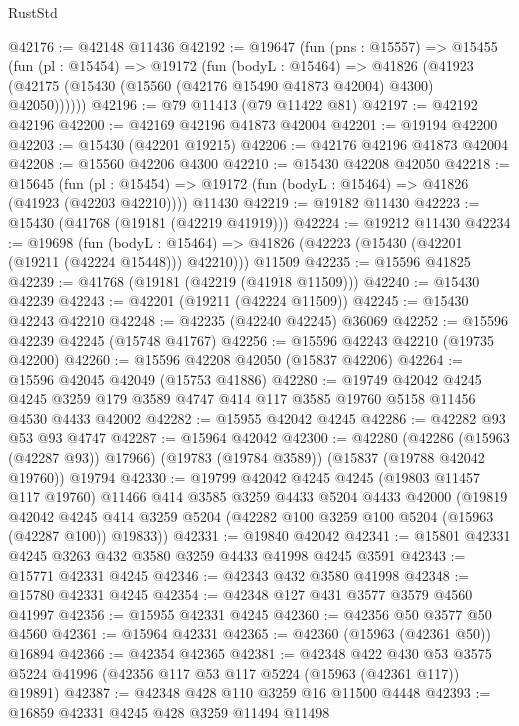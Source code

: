 \begin{lexlean}{RustStd}
\begin{coremodule}
{\begin{coremodule}
{{{{{{{{{{{{{{{{{{{{{{{{{{{{{{{{{{{{{{{{{{{{{{{{{{{{{{{{{{{{@42176 := @42148 @11436
@42192 := @19647
    (fun (pns : @15557) =>
    @15455
      (fun (pl : @15454) =>
      @19172
        (fun (bodyL : @15464) =>
        @41826 (@41923 (@42175 (@15430 (@15560 (@42176 @15490 @41873 @42004) @4300) @42050))))))
@42196 := @79 @11413 (@79 @11422 @81)
@42197 := @42192 @42196
@42200 := @42169 @42196 @41873 @42004
@42201 := @19194 @42200
@42203 := @15430 (@42201 @19215)
@42206 := @42176 @42196 @41873 @42004
@42208 := @15560 @42206 @4300
@42210 := @15430 @42208 @42050
@42218 := @15645
    (fun (pl : @15454) => @19172 (fun (bodyL : @15464) => @41826 (@41923 (@42203 @42210))))
    @11430
@42219 := @19182 @11430
@42223 := @15430 (@41768 (@19181 (@42219 @41919)))
@42224 := @19212 @11430
@42234 := @19698
    (fun (bodyL : @15464) => @41826 (@42223 (@15430 (@42201 (@19211 (@42224 @15448))) @42210)))
    @11509
@42235 := @15596 @41825
@42239 := @41768 (@19181 (@42219 (@41918 @11509)))
@42240 := @15430 @42239
@42243 := @42201 (@19211 (@42224 @11509))
@42245 := @15430 @42243 @42210
@42248 := @42235 (@42240 @42245) @36069
@42252 := @15596 @42239 @42245 (@15748 @41767)
@42256 := @15596 @42243 @42210 (@19735 @42200)
@42260 := @15596 @42208 @42050 (@15837 @42206)
@42264 := @15596 @42045 @42049 (@15753 @41886)
@42280 := @19749
    @42042
    @4245
    @4245
    @3259
    @179
    @3589
    @4747
    @414
    @117
    @3585
    @19760
    @5158
    @11456
    @4530
    @4433
    @42002
@42282 := @15955 @42042 @4245
@42286 := @42282 @93 @53 @93 @4747
@42287 := @15964 @42042
@42300 := @42280
    (@42286 (@15963 (@42287 @93)) @17966)
    (@19783 (@19784 @3589))
    (@15837 (@19788 @42042 @19760))
    @19794
@42330 := @19799
    @42042
    @4245
    @4245
    (@19803 @11457 @117 @19760)
    @11466
    @414
    @3585
    @3259
    @4433
    @5204
    @4433
    @42000
    (@19819
      @42042
      @4245
      @414
      @3259
      @5204
      (@42282 @100 @3259 @100 @5204 (@15963 (@42287 @100)) @19833))
@42331 := @19840 @42042
@42341 := @15801 @42331 @4245 @3263 @432 @3580 @3259 @4433 @41998 @4245 @3591
@42343 := @15771 @42331 @4245
@42346 := @42343 @432 @3580 @41998
@42348 := @15780 @42331 @4245
@42354 := @42348 @127 @431 @3577 @3579 @4560 @41997
@42356 := @15955 @42331 @4245
@42360 := @42356 @50 @3577 @50 @4560
@42361 := @15964 @42331
@42365 := @42360 (@15963 (@42361 @50)) @16894
@42366 := @42354 @42365
@42381 := @42348
    @422
    @430
    @53
    @3575
    @5224
    @41996
    (@42356 @117 @53 @117 @5224 (@15963 (@42361 @117)) @19891)
@42387 := @42348 @428 @110 @3259 @16 @11500 @4448
@42393 := @16859 @42331 @4245 @428 @3259 @11494 @11498
}}}}}}}}}}}}}}}}}}}}}}}}}}}}}}}}}}}}}}}}}}}}}}}}}}}}}}}}}}}}
\end{coremodule}}
\end{coremodule}
\end{lexlean}
